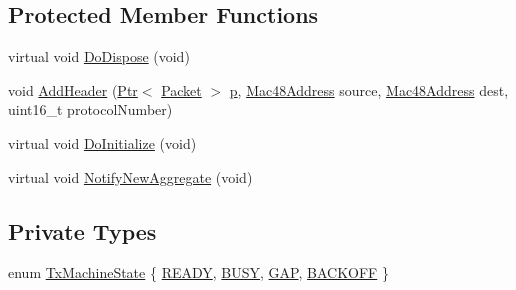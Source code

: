 \subsection*{Protected Member Functions}
\begin{DoxyCompactItemize}
\item 
virtual void \hyperlink{classns3_1_1CsmaNetDevice_a9d516f357637bc0994c3babadd5f14e7}{Do\+Dispose} (void)
\item 
void \hyperlink{classns3_1_1CsmaNetDevice_a736bf6ce5851ace677f8fc693a92855c}{Add\+Header} (\hyperlink{classns3_1_1Ptr}{Ptr}$<$ \hyperlink{classns3_1_1Packet}{Packet} $>$ \hyperlink{lte__link__budget__x2__handover__measures_8m_ac9de518908a968428863f829398a4e62}{p}, \hyperlink{classns3_1_1Mac48Address}{Mac48\+Address} source, \hyperlink{classns3_1_1Mac48Address}{Mac48\+Address} dest, uint16\+\_\+t protocol\+Number)
\item 
virtual void \hyperlink{classns3_1_1CsmaNetDevice_a2632c23827564f42d14b5c512db9314e}{Do\+Initialize} (void)
\item 
virtual void \hyperlink{classns3_1_1CsmaNetDevice_a45857b94ade04508597e30ab15b9963c}{Notify\+New\+Aggregate} (void)
\end{DoxyCompactItemize}
\subsection*{Private Types}
\begin{DoxyCompactItemize}
\item 
enum \hyperlink{classns3_1_1CsmaNetDevice_a46c532357164a954c46a01f05f8d78f4}{Tx\+Machine\+State} \{ \hyperlink{classns3_1_1CsmaNetDevice_a46c532357164a954c46a01f05f8d78f4a50a4f4ac7775f95f3ec1d4624213bee2}{R\+E\+A\+DY}, 
\hyperlink{classns3_1_1CsmaNetDevice_a46c532357164a954c46a01f05f8d78f4a84e62edebfa7e85ec23402f94bb1361a}{B\+U\+SY}, 
\hyperlink{classns3_1_1CsmaNetDevice_a46c532357164a954c46a01f05f8d78f4ab6c58ad6a7f71f004ea78a8ccb9362c6}{G\+AP}, 
\hyperlink{classns3_1_1CsmaNetDevice_a46c532357164a954c46a01f05f8d78f4a415034117cf23985cd8d3481944cd731}{B\+A\+C\+K\+O\+FF}
 \}
\end{DoxyCompactItemize}
